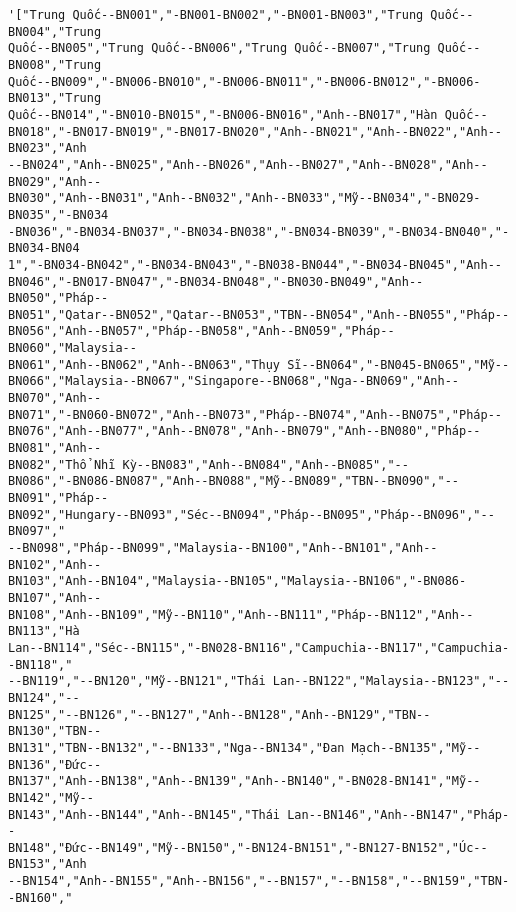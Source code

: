 \documentclass[11pt]{article}
\makeatletter
\newcommand{\boxspacing}{\kern\kvtcb@left@rule\kern\kvtcb@boxsep}
\newcommand{\prompt}[4]{
        \ttfamily\llap{{\color{#2}[#3]:\hspace{3pt}#4}}\vspace{-\baselineskip}
    }
\makeatother
\begin{document}
            \begin{tcolorbox}[breakable, size=fbox, boxrule=.5pt, pad at break*=1mm, opacityfill=0]
\prompt{Out}{outcolor}{289}{\boxspacing}
\begin{Verbatim}[commandchars=\\\{\}]
'["Trung Quốc--BN001","-BN001-BN002","-BN001-BN003","Trung Quốc--BN004","Trung
Quốc--BN005","Trung Quốc--BN006","Trung Quốc--BN007","Trung Quốc--BN008","Trung
Quốc--BN009","-BN006-BN010","-BN006-BN011","-BN006-BN012","-BN006-BN013","Trung
Quốc--BN014","-BN010-BN015","-BN006-BN016","Anh--BN017","Hàn Quốc--
BN018","-BN017-BN019","-BN017-BN020","Anh--BN021","Anh--BN022","Anh--BN023","Anh
--BN024","Anh--BN025","Anh--BN026","Anh--BN027","Anh--BN028","Anh--BN029","Anh--
BN030","Anh--BN031","Anh--BN032","Anh--BN033","Mỹ--BN034","-BN029-BN035","-BN034
-BN036","-BN034-BN037","-BN034-BN038","-BN034-BN039","-BN034-BN040","-BN034-BN04
1","-BN034-BN042","-BN034-BN043","-BN038-BN044","-BN034-BN045","Anh--
BN046","-BN017-BN047","-BN034-BN048","-BN030-BN049","Anh--BN050","Pháp--
BN051","Qatar--BN052","Qatar--BN053","TBN--BN054","Anh--BN055","Pháp--
BN056","Anh--BN057","Pháp--BN058","Anh--BN059","Pháp--BN060","Malaysia--
BN061","Anh--BN062","Anh--BN063","Thụy Sĩ--BN064","-BN045-BN065","Mỹ--
BN066","Malaysia--BN067","Singapore--BN068","Nga--BN069","Anh--BN070","Anh--
BN071","-BN060-BN072","Anh--BN073","Pháp--BN074","Anh--BN075","Pháp--
BN076","Anh--BN077","Anh--BN078","Anh--BN079","Anh--BN080","Pháp--BN081","Anh--
BN082","Thổ Nhĩ Kỳ--BN083","Anh--BN084","Anh--BN085","--
BN086","-BN086-BN087","Anh--BN088","Mỹ--BN089","TBN--BN090","--BN091","Pháp--
BN092","Hungary--BN093","Séc--BN094","Pháp--BN095","Pháp--BN096","--BN097","
--BN098","Pháp--BN099","Malaysia--BN100","Anh--BN101","Anh--BN102","Anh--
BN103","Anh--BN104","Malaysia--BN105","Malaysia--BN106","-BN086-BN107","Anh--
BN108","Anh--BN109","Mỹ--BN110","Anh--BN111","Pháp--BN112","Anh--BN113","Hà
Lan--BN114","Séc--BN115","-BN028-BN116","Campuchia--BN117","Campuchia--BN118","
--BN119","--BN120","Mỹ--BN121","Thái Lan--BN122","Malaysia--BN123","--BN124","--
BN125","--BN126","--BN127","Anh--BN128","Anh--BN129","TBN--BN130","TBN--
BN131","TBN--BN132","--BN133","Nga--BN134","Đan Mạch--BN135","Mỹ--BN136","Đức--
BN137","Anh--BN138","Anh--BN139","Anh--BN140","-BN028-BN141","Mỹ--BN142","Mỹ--
BN143","Anh--BN144","Anh--BN145","Thái Lan--BN146","Anh--BN147","Pháp--
BN148","Đức--BN149","Mỹ--BN150","-BN124-BN151","-BN127-BN152","Úc--BN153","Anh
--BN154","Anh--BN155","Anh--BN156","--BN157","--BN158","--BN159","TBN--BN160","

\end{Verbatim}
\end{tcolorbox}
\end{document}
